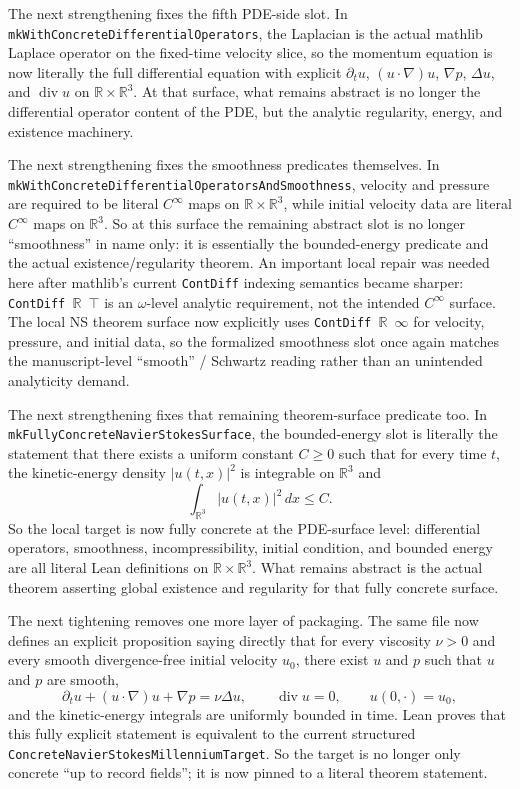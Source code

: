\documentclass[11pt]{article}
\begin{document}
The next strengthening fixes the fifth PDE-side slot.  In
\texttt{mkWithConcreteDifferentialOperators}, the Laplacian is the actual
mathlib Laplace operator on the fixed-time velocity slice, so the momentum
equation is now literally the full differential equation with explicit
\(\partial_t u\), \((u \cdot \nabla)u\), \(\nabla p\), \(\Delta u\), and
\(\operatorname{div} u\) on \(\mathbb{R} \times \mathbb{R}^3\).  At that
surface, what remains abstract is no longer the differential operator content
of the PDE, but the analytic regularity, energy, and existence machinery.

The next strengthening fixes the smoothness predicates themselves.  In
\texttt{mkWithConcreteDifferentialOperatorsAndSmoothness}, velocity and
pressure are required to be literal \(C^\infty\) maps on
\(\mathbb{R} \times \mathbb{R}^3\), while initial velocity data are literal
\(C^\infty\) maps on \(\mathbb{R}^3\).  So at this surface the remaining
abstract slot is no longer “smoothness” in name only: it is essentially the
bounded-energy predicate and the actual existence/regularity theorem.
An important local repair was needed here after mathlib's current
\texttt{ContDiff} indexing semantics became sharper: \texttt{ContDiff~$\mathbb R$~$\top$}
is an \(\omega\)-level analytic requirement, not the intended \(C^\infty\)
surface.  The local NS theorem surface now explicitly uses
\texttt{ContDiff~$\mathbb R$~$\infty$} for velocity, pressure, and initial data,
so the formalized smoothness slot once again matches the manuscript-level
``smooth'' / Schwartz reading rather than an unintended analyticity demand.

The next strengthening fixes that remaining theorem-surface predicate too.  In
\texttt{mkFullyConcreteNavierStokesSurface}, the bounded-energy slot is
literally the statement that there exists a uniform constant \(C \ge 0\) such
that for every time \(t\), the kinetic-energy density \(|u(t,x)|^2\) is
integrable on \(\mathbb{R}^3\) and
\[
\int_{\mathbb{R}^3} |u(t,x)|^2\,dx \le C.
\]
So the local target is now fully concrete at the PDE-surface level:
differential operators, smoothness, incompressibility, initial condition, and
bounded energy are all literal Lean definitions on
\(\mathbb{R} \times \mathbb{R}^3\).  What remains abstract is the actual theorem
asserting global existence and regularity for that fully concrete surface.

The next tightening removes one more layer of packaging.  The same file now
defines an explicit proposition saying directly that for every viscosity
\(\nu > 0\) and every smooth divergence-free initial velocity \(u_0\), there
exist \(u\) and \(p\) such that \(u\) and \(p\) are smooth,
\[
\partial_t u + (u \cdot \nabla)u + \nabla p = \nu \Delta u,\qquad
\operatorname{div} u = 0,\qquad
u(0,\cdot)=u_0,
\]
and the kinetic-energy integrals are uniformly bounded in time.  Lean proves
that this fully explicit statement is equivalent to the current structured
\texttt{ConcreteNavierStokesMillenniumTarget}.  So the target is no longer only
concrete “up to record fields”; it is now pinned to a literal theorem statement.
\end{document}
